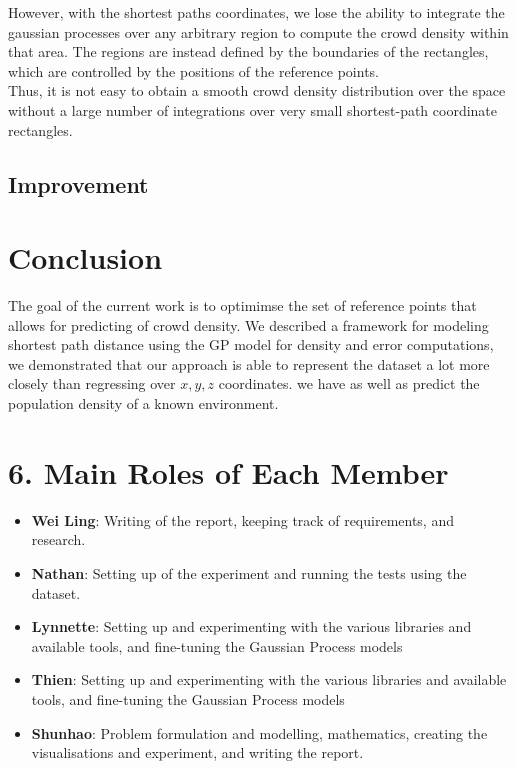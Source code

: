 \documentclass[letterpaper]{article}
\begin{document}
However, with the shortest paths coordinates, we lose the ability to integrate the gaussian processes over any arbitrary region to compute the crowd density within that area. The regions are instead defined by the boundaries of the rectangles, which are controlled by the positions of the reference points.\\

Thus, it is not easy to obtain a smooth crowd density distribution over the space without a large number of integrations over very small shortest-path coordinate rectangles.\\


\subsection{Improvement}


\section{Conclusion}

The goal of the current work is to optimimse the set of reference points that allows for predicting of crowd density. We described a framework for modeling shortest path distance using the GP model for density and error computations, we demonstrated that our approach is able to represent the dataset a lot more closely than regressing over $x,y,z$ coordinates. we have as well as predict the population density of a known environment.

\section{6. Main Roles of Each Member}
\begin{itemize}
\item \textbf{Wei Ling}: 
Writing of the report, keeping track of requirements, and research.
\item \textbf{Nathan}: 
Setting up of the experiment and running the tests using the dataset.
\item \textbf{Lynnette}: 
Setting up and experimenting with the various libraries and available tools, and fine-tuning the Gaussian Process models
\item \textbf{Thien}: 
Setting up and experimenting with the various libraries and available tools, and fine-tuning the Gaussian Process models
\item \textbf{Shunhao}: 
Problem formulation and modelling, mathematics, creating the visualisations and experiment, and writing the report.
\end{itemize}



\end{document}
